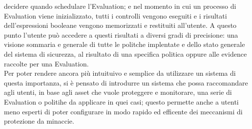 decidere quando schedulare l'Evaluation; e nel momento in cui un processo di Evaluation viene inizializzato, tutti i controlli vengono 
eseguiti e i risultati dell'espressioni booleane vengono memorizzati e restituiti all'utente. A questo punto l'utente può accedere a 
questi risultati a diversi gradi di precisione: una visione sommaria e generale di tutte le politche implentate e dello stato generale 
del sistema di sicurezza, al risultato di una specifica politica oppure alle evidence raccolte per una Evaluation.\\
Per poter rendere ancora più intuituivo e semplice da utilizzare un sistema di questa importanza, si è pensato di introdurre un sistema
che possa raccomandare agli utenti, in base agli asset che vuole proteggere e monitorare, una serie di Evaluation o politihe da
applicare in quei casi; questo permette anche a utenti meno esperti di poter configurare in modo rapido ed efficente dei meccanismi di
protezione da minaccie.